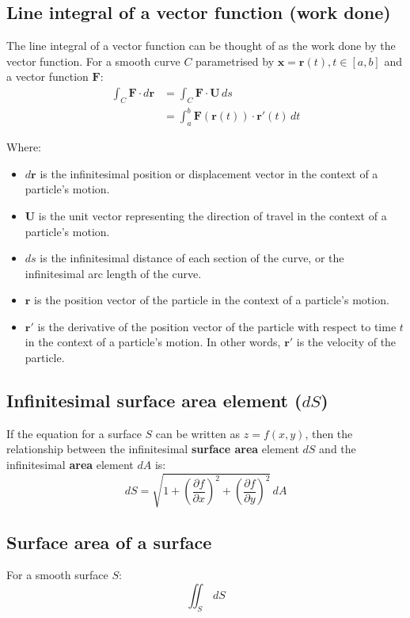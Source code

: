 \documentclass[11pt]{article}
\begin{document}
 \newpage

\subsection{Line integral of a vector function (work done)}
\label{sec:org5c5399c}
The line integral of a vector function can be thought of as the work done by the vector function.
For a smooth curve \(C\) parametrised by \(\boldsymbol{x} = \boldsymbol{r} (t), t \in [a, b]\) and a vector function \(\boldsymbol{F}\):
\begin{align*}
\int_C \boldsymbol{F} \cdot d \boldsymbol{r} &= \int_C \boldsymbol{F} \cdot \boldsymbol{U} \, ds \\
&= \int_a^b \boldsymbol{F} (\boldsymbol{r} (t)) \cdot \boldsymbol{r'} (t) \, dt
\end{align*}

Where:
\begin{itemize}
\item \(d \boldsymbol{r}\) is the infinitesimal position or displacement vector in the context of a particle's motion.
\item \(\boldsymbol{U}\) is the unit vector representing the direction of travel in the context of a particle's motion.
\item \(ds\) is the infinitesimal distance of each section of the curve, or the infinitesimal arc length of the curve.
\item \(\boldsymbol{r}\) is the position vector of the particle in the context of a particle's motion.
\item \(\boldsymbol{r'}\) is the derivative of the position vector of the particle with respect to time \(t\) in the context of a particle's motion. In other words, \(\boldsymbol{r'}\) is the velocity of the particle.
\end{itemize}

\subsection{Infinitesimal surface area element (\(dS\))}
\label{sec:orgf16be00}
If the equation for a surface \(S\) can be written as \(z = f(x, y)\), then the relationship between the infinitesimal \textbf{surface area} element \(dS\) and the infinitesimal \textbf{area} element \(dA\) is:
\[dS = \sqrt{1 + \left(\frac{\partial f}{\partial x} \right)^2 + \left(\frac{\partial f}{\partial y} \right)^2} \, dA\]

\subsection{Surface area of a surface}
\label{sec:org0d70398}
For a smooth surface \(S\):
\[\iint_S \, dS\]
\end{document}
